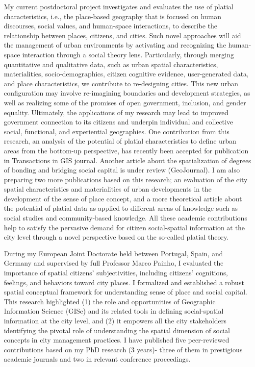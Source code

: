 My current postdoctoral project investigates and evaluates the use of platial characteristics, i.e., the place-based geography that is focused on human discourses, social values, and human-space interactions, to describe the relationship between places, citizens, and cities. Such novel approaches will aid the management of urban environments by activating and recognizing the human-space interaction through a social theory lens. Particularly, through merging quantitative and qualitative data, such as urban spatial characteristics, materialities, socio-demographics, citizen cognitive evidence, user-generated data, and place characteristics, we contribute to re-designing cities. This new urban configuration may involve re-imagining boundaries and development strategies, as well as realizing some of the promises of open government, inclusion, and gender equality. Ultimately, the applications of my research may lead to improved government connection to its citizens and underpin individual and collective social, functional, and experiential geographies. One contribution from this research, an analysis of the potential of platial characteristics to define urban areas from the bottom-up perspective, has recently been accepted for publication in Transactions in GIS journal. Another article about the spatialization of degrees of bonding and bridging social capital is under review (GeoJournal). I am also preparing two more publications based on this research; an evaluation of the city spatial characteristics and materialities of urban developments in the development of the sense of place concept, and a more theoretical article about the potential of platial data as applied to different areas of knowledge such as social studies and community-based knowledge. All these academic contributions help to satisfy the pervasive demand for citizen social-spatial information at the city level through a novel perspective based on the so-called platial theory.\par


During my European Joint Doctorate held between Portugal, Spain, and Germany and supervised by full Professor Marco Painho, I evaluated the importance of spatial citizens’ subjectivities, including citizens’ cognitions, feelings, and behaviors toward city places. I formalized and established a robust spatial conceptual framework for understanding sense of place and social capital. This research highlighted (1) the role and opportunities of Geographic Information Science (GISc) and its related tools in defining social-spatial information at the city level, and (2) it empowers all the city stakeholders identifying the pivotal role of understanding the spatial dimension of social concepts in city management practices. I have published five peer-reviewed contributions based on my PhD research (3 years)- three of them in prestigious academic journals and two in relevant conference proceedings.\par

